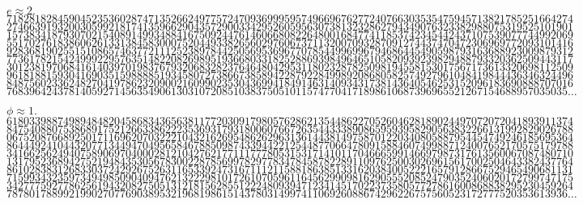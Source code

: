 \documentclass{tufte-book}
\begin{document}
\vspace{.3\baselineskip}$e\approx2.$\\
$7182818284590452353602874713526624977572470936999595749669676277240766303535475945713821785251664274$\\
$2746639193200305992181741359662904357290033429526059563073813232862794349076323382988075319525101901$\\
$1573834187930702154089149934884167509244761460668082264800168477411853742345442437107539077744992069$\\
$5517027618386062613313845830007520449338265602976067371132007093287091274437470472306969772093101416$\\
$9283681902551510865746377211125238978442505695369677078544996996794686445490598793163688923009879312$\\
$7736178215424999229576351482208269895193668033182528869398496465105820939239829488793320362509443117$\\
$3012381970684161403970198376793206832823764648042953118023287825098194558153017567173613320698112509$\\
$9618188159304169035159888851934580727386673858942287922849989208680582574927961048419844436346324496$\\
$8487560233624827041978623209002160990235304369941849146314093431738143640546253152096183690888707016$\\
$768396424378140592714563549061303107208510383750510115747704171898610687396965521267154688957035035\dots$

\vspace{0.5\baselineskip}$\phi\approx1.$\\
$6180339887498948482045868343656381177203091798057628621354486227052604628189024497072072041893911374$\\
$8475408807538689175212663386222353693179318006076672635443338908659593958290563832266131992829026788$\\
$0675208766892501711696207032221043216269548626296313614438149758701220340805887954454749246185695364$\\
$8644492410443207713449470495658467885098743394422125448770664780915884607499887124007652170575179788$\\
$3416625624940758906970400028121042762177111777805315317141011704666599146697987317613560067087480710$\\
$1317952368942752194843530567830022878569978297783478458782289110976250030269615617002504643382437764$\\
$8610283831268330372429267526311653392473167111211588186385133162038400522216579128667529465490681131$\\
$7159934323597349498509040947621322298101726107059611645629909816290555208524790352406020172799747175$\\
$3427775927786256194320827505131218156285512224809394712341451702237358057727861600868838295230459264$\\
$787801788992199027077690389532196819861514378031499741106926088674296226757560523172777520353613936\dots$
\end{document}
